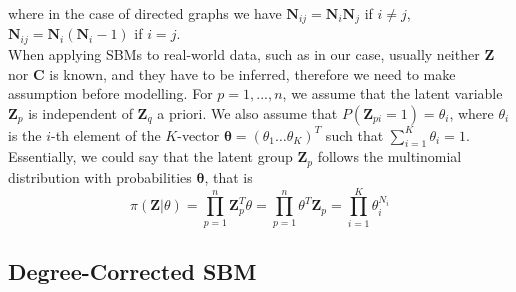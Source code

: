 where in the case of directed graphs we have $\mathbf{N}_{ij} = \mathbf{N}_i\mathbf{N}_j$ if $i \neq j$, $\mathbf{N}_{ij} = \mathbf{N}_i(\mathbf{N}_i-1)$ if $i=j$.\\
When applying SBMs to real-world data, such as in our case, usually neither $\mathbf{Z}$ nor $\mathbf{C}$ is known, and they have to be inferred, therefore we need to make assumption before modelling. For $p = 1,...,n$, we assume that the latent variable $\mathbf{Z}_p$ is independent of $\mathbf{Z}_q$ a priori. We also assume that $P(\mathbf{Z}_{pi}=1) = \theta_i$, where $\theta_i$ is the $i$-th element of the $K$-vector $\mathbf{\theta} = (\theta_1 \dots \theta_K)^T$ such that $\sum_{i=1}^K \theta_i = 1$. Essentially, we could say that the latent group $\mathbf{Z}_p$ follows the multinomial distribution with probabilities $\mathbf{\theta}$, that is
\begin{equation}
    \pi(\mathbf{Z}|\theta) = \prod_{p=1}^n \mathbf{Z}_p^T \theta = \prod_{p=1}^n \theta^T \mathbf{Z}_p = \prod_{i=1}^K \theta^{N_i}_i
\end{equation}

\subsection{Degree-Corrected SBM}
